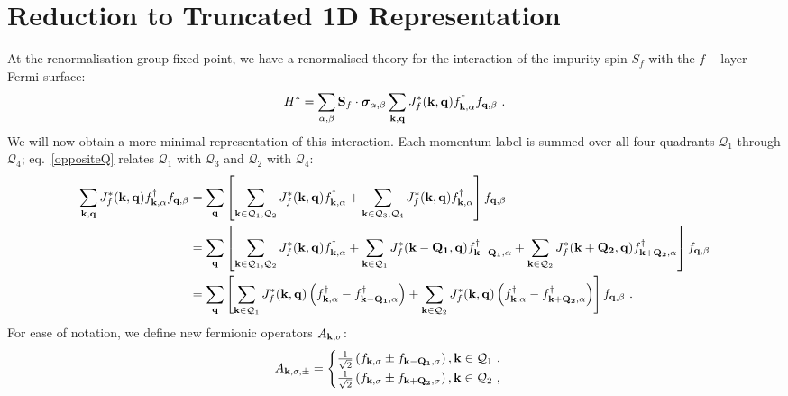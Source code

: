\documentclass[%
reprint,
superscriptaddress,
groupedaddress,
superscriptaddress,
onecolumn,
10pt
]{revtex4-2}
\begin{document}
\section{Reduction to Truncated 1D Representation}
At the renormalisation group fixed point, we have a renormalised theory for the interaction of the impurity spin \(S_f\) with the \(f-\)layer Fermi surface:
\begin{equation}\begin{aligned}
	H^* = \sum_{\alpha,\beta}{\bf S}_f\cdot{\boldsymbol\sigma}_{\alpha,\beta}\sum_{{\bf k}, {\bf q}} J_f^*({\bf k},{\bf q}) f^\dagger_{{\bf k},\alpha}f_{{\bf q},\beta}~.
\end{aligned}\end{equation}
We will now obtain a more minimal representation of this interaction. Each momentum label is summed over all four quadrants \(\mathcal{Q}_1\) through \(\mathcal{Q}_4\); eq.~\ref{oppositeQ} relates \(\mathcal{Q}_1\) with \(\mathcal{Q}_3\) and \(\mathcal{Q}_2\) with \(\mathcal{Q}_4\):
\begin{equation}\begin{aligned}
	\sum_{{\bf k}, {\bf q}} J_f^*({\bf k},{\bf q}) f^\dagger_{{\bf k},\alpha}f_{{\bf q},\beta} 
	&= \sum_{\bf q}\left[\sum_{{\bf k} \in \mathcal{Q}_1,\mathcal{Q}_2} J_f^*({\bf k},{\bf q}) f^\dagger_{{\bf k},\alpha} + \sum_{{\bf k} \in \mathcal{Q}_3,\mathcal{Q}_4} J_f^*({\bf k},{\bf q}) f^\dagger_{{\bf k},\alpha}\right] f_{{\bf q},\beta}\\
	&= \sum_{\bf q}\left[\sum_{{\bf k} \in \mathcal{Q}_1,\mathcal{Q}_2} J_f^*({\bf k},{\bf q}) f^\dagger_{{\bf k},\alpha} + \sum_{{\bf k} \in \mathcal{Q}_1} J_f^*({\bf k - Q_1},{\bf q}) f^\dagger_{{\bf k - Q_1},\alpha} + \sum_{{\bf k} \in \mathcal{Q}_2} J_f^*({\bf k + Q_2},{\bf q}) f^\dagger_{{\bf k + Q_2},\alpha}\right] f_{{\bf q},\beta}\\
	&= \sum_{\bf q}\left[\sum_{{\bf k} \in \mathcal{Q}_1} J_f^*({\bf k},{\bf q}) \left(f^\dagger_{{\bf k},\alpha} - f^\dagger_{{\bf k - Q_1},\alpha}\right) + \sum_{{\bf k} \in \mathcal{Q}_2} J_f^*({\bf k},{\bf q}) \left(f^\dagger_{{\bf k},\alpha} - f^\dagger_{{\bf k + Q_2},\alpha}\right) \right] f_{{\bf q},\beta}~.
\end{aligned}\end{equation}
For ease of notation, we define new fermionic operators \(A_{{\bf k},\sigma}\):
\begin{equation}\begin{aligned}\label{defineA}
	A_{{\bf k},\sigma,\pm} = \begin{cases}
		\frac{1}{\sqrt{2}}\left(f_{{\bf k},\sigma} \pm f_{{\bf k - Q_1},\sigma}\right), {\bf k}\in\mathcal{Q}_1~,\\
		\frac{1}{\sqrt{2}}\left(f_{{\bf k},\sigma} \pm f_{{\bf k + Q_2},\sigma}\right), {\bf k}\in\mathcal{Q}_2~,
	\end{cases}
\end{aligned}\end{equation}
\end{document}
